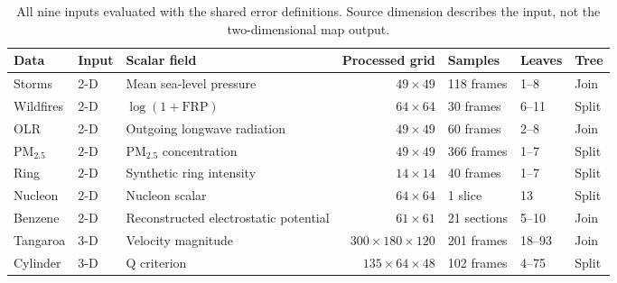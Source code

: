 \begin{table}[t]
\caption{All nine inputs evaluated with the shared error definitions. Source dimension describes the input, not the two-dimensional map output.}\label{tab:datasets_main}
\centering\footnotesize\setlength{\tabcolsep}{4pt}
\begin{tabular}{lllrlll}\toprule
Data & Input & Scalar field & Processed grid & Samples & Leaves & Tree\\\midrule
Storms & 2-D & Mean sea-level pressure & $49\times49$ & 118 frames & 1--8 & Join\\
Wildfires & 2-D & $\log(1+\mathrm{FRP})$ & $64\times64$ & 30 frames & 6--11 & Split\\
OLR & 2-D & Outgoing longwave radiation & $49\times49$ & 60 frames & 2--8 & Join\\
PM$_{2.5}$ & 2-D & PM$_{2.5}$ concentration & $49\times49$ & 366 frames & 1--7 & Split\\
Ring & 2-D & Synthetic ring intensity & $14\times14$ & 40 frames & 1--7 & Split\\
Nucleon & 2-D & Nucleon scalar & $64\times64$ & 1 slice & 13 & Split\\
Benzene & 2-D & Reconstructed electrostatic potential & $61\times61$ & 21 sections & 5--10 & Join\\
Tangaroa & 3-D & Velocity magnitude & $300\times180\times120$ & 201 frames & 18--93 & Join\\
Cylinder & 3-D & Q criterion & $135\times64\times48$ & 102 frames & 4--75 & Split\\
\bottomrule\end{tabular}
\par{}
\end{table}
